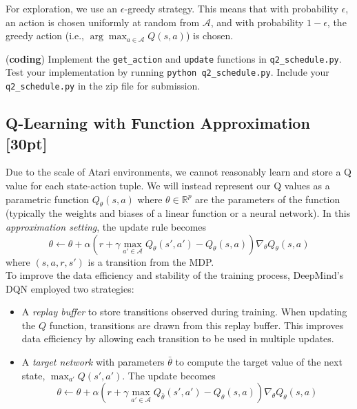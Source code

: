 \documentclass[11pt]{article}
\theoremstyle{case}
\begin{document}
For exploration, we use an $\epsilon$-greedy strategy.
This means that with probability $\epsilon$, an action is chosen uniformly at random from $\mathcal{A}$, and with probability $1-\epsilon$, the greedy action (i.e., $\arg\max_{a \in \mathcal{A}} Q(s,a)$) is chosen.

({\bf coding}) Implement the \texttt{get\_action} and \texttt{update} functions in \texttt{q2\_schedule.py}. Test your implementation by running \texttt{python q2\_schedule.py}.
Include your \texttt{q2\_schedule.py} in the zip file for submission.


\subsection{Q-Learning with Function Approximation [30pt]} 
Due to the scale of Atari environments, we cannot reasonably learn and store a Q value for each state-action tuple. We will instead represent our Q values as a parametric function $Q_{\theta}(s,a)$ where $\theta \in \mathbb{R}^p$ are the parameters of the function (typically the weights and biases of a linear function or a neural network). In this \emph{approximation setting}, the update rule becomes
\begin{equation}
\theta \leftarrow \theta + \alpha\left(r+\gamma \max_{a' \in \mathcal{A}} Q_{\theta}(s', a') - Q_{\theta}(s, a)\right) \nabla_{\theta}Q_{\theta}(s, a) \label{eqn:faq}
\end{equation}
where $(s,a,r,s')$ is a transition from the MDP.\\

To improve the data efficiency and stability of the training process, DeepMind's DQN employed two strategies:
\begin{itemize}
	\item A \textit{replay buffer} to store transitions observed during training. When updating the $Q$ function, transitions are drawn from this replay buffer. This improves data efficiency by allowing each transition to be used in multiple updates.
	
	\item A \textit{target network} with parameters $\bar{\theta}$ to compute the target value of the next state, $\max_{a'} Q(s',a')$. The update becomes
	\begin{equation}
	\theta \leftarrow \theta + \alpha\left(r+\gamma \max_{a' \in \mathcal{A}}Q_{\bar{\theta}}\left(s', a'\right) - Q_{\theta}(s, a)\right) \nabla_{\theta} Q_{\theta}(s, a) \label{eqn:target-update}
	\end{equation}
\end{itemize}
\end{document}
